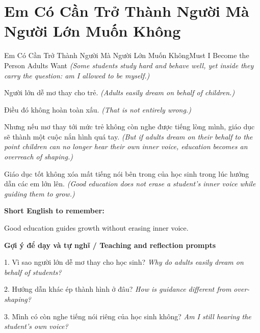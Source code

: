 \section{Em Có Cần Trở Thành Người Mà Người Lớn Muốn Không}
\begin{truyen}{Em Có Cần Trở Thành Người Mà Người Lớn Muốn Không}{Must I Become the Person Adults Want}
\textit{(Some students study hard and behave well, yet inside they carry the question: am I allowed to be myself.)}

Người lớn dễ mơ thay cho trẻ.
\textit{(Adults easily dream on behalf of children.)}

Điều đó không hoàn toàn xấu.
\textit{(That is not entirely wrong.)}

Nhưng nếu mơ thay tới mức trẻ không còn nghe được tiếng lòng mình, giáo dục sẽ thành một cuộc nắn hình quá tay.
\textit{(But if adults dream on their behalf to the point children can no longer hear their own inner voice, education becomes an overreach of shaping.)}

\end{truyen}

\begin{baihoc}
Giáo dục tốt không xóa mất tiếng nói bên trong của học sinh trong lúc hướng dẫn các em lớn lên.
\textit{(Good education does not erase a student's inner voice while guiding them to grow.)}
\end{baihoc}

\begin{ghinhoanh}
\textbf{Short English to remember:}

Good education guides growth without erasing inner voice.

\end{ghinhoanh}

\begin{tuhocnhanh}
\textbf{Gợi ý để dạy và tự nghĩ / Teaching and reflection prompts}

1. Vì sao người lớn dễ mơ thay cho học sinh? \textit{Why do adults easily dream on behalf of students?}

2. Hướng dẫn khác ép thành hình ở đâu? \textit{How is guidance different from over-shaping?}

3. Mình có còn nghe tiếng nói riêng của học sinh không? \textit{Am I still hearing the student's own voice?}
\end{tuhocnhanh}
\ngancach

